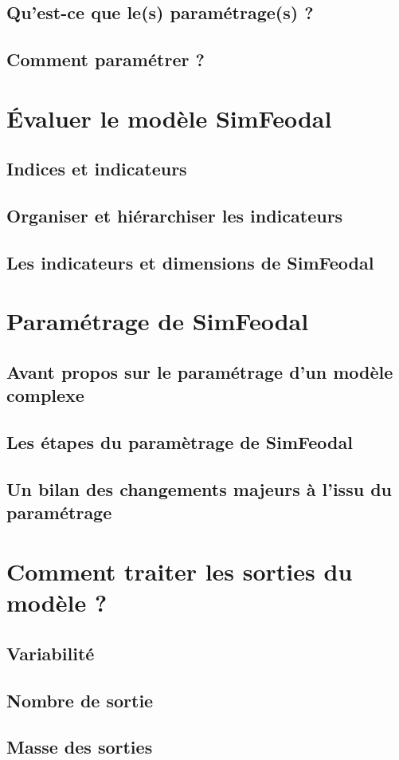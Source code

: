 \documentclass[12pt, a4paper, oneside]{book}
\begin{document}
	\subsection{Qu'est-ce que le(s) paramétrage(s) ?}
	\subsection{Comment paramétrer ?}
	
	
	\setcounter{section}{2}
	
	\section[Évaluer SimFeodal]{Évaluer le modèle SimFeodal}
	\subsection{Indices et indicateurs}
	\subsection{Organiser et hiérarchiser les indicateurs}
	\subsection{Les indicateurs et dimensions de SimFeodal}
	
	
	\setcounter{section}{3}
%	
	\section{Paramétrage de SimFeodal}
	\subsection{Avant propos sur le paramétrage d'un modèle complexe}
	\subsection{Les étapes du paramètrage de SimFeodal}
	\subsection{Un bilan des changements majeurs à l'issu du paramétrage}
	
	\setcounter{section}{4}
%	
	\section{Comment traiter les sorties du modèle ?}
	\subsection{Variabilité}
	\subsection{Nombre de sortie}
	\subsection{Masse des sorties}

	
	
\end{document}
